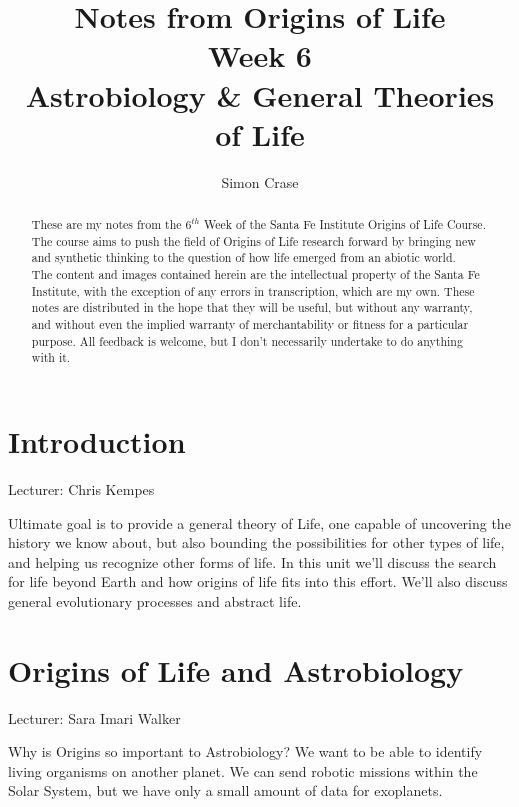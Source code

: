 \documentclass[]{article}
\title{
	Notes from Origins of Life\\
	Week 6\\
	 Astrobiology \& General Theories of Life
}
\author{Simon Crase}
\begin{document}
\maketitle

\begin{abstract}
   These are my notes from the $6^{th}$ Week of the Santa Fe Institute Origins of Life Course\cite{sfi2020}. The course aims to push the field of Origins of Life research forward by bringing new and synthetic thinking to the question of how life emerged from an abiotic world.\\
   The content and images contained herein are the intellectual property of the Santa Fe Institute, with the exception of any errors in transcription, which are my own.
   These notes are distributed in the hope that they will be useful,
   but without any warranty, and without even the implied warranty of
   merchantability or fitness for a particular purpose. All feedback is welcome,
   but I don't necessarily undertake to do anything with it.

\end{abstract}

\setcounter{tocdepth}{2}
\tableofcontents

\listoffigures

\section{Introduction}

Lecturer: Chris Kempes

Ultimate goal is to provide a general theory of Life, one capable of uncovering the history we know about, but also bounding the possibilities for other types of life, and helping us recognize other forms of life. In this unit we'll discuss the search for life beyond Earth and how origins of life fits into this effort. We'll also discuss general evolutionary processes and abstract life. 

\section{Origins of Life and Astrobiology}

Lecturer: Sara Imari Walker

Why is Origins so important to Astrobiology? We want to be able to identify living organisms on another planet. We can send robotic missions within the Solar System, but we have only a small amount of data for exoplanets.
\end{document}
